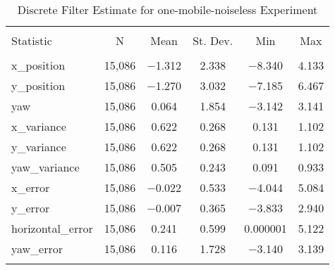 
\begin{table}[h] \centering 
  \caption{Discrete Filter Estimate for one-mobile-noiseless Experiment} 
  \label{tab:one_mobile_noiseless_discrete_summary} 
\begin{tabular}{@{\extracolsep{5pt}}lccccc} 
\\[-1.8ex]\hline 
\hline \\[-1.8ex] 
Statistic & \multicolumn{1}{c}{N} & \multicolumn{1}{c}{Mean} & \multicolumn{1}{c}{St. Dev.} & \multicolumn{1}{c}{Min} & \multicolumn{1}{c}{Max} \\ 
\hline \\[-1.8ex] 
x\_position & 15,086 & $-$1.312 & 2.338 & $-$8.340 & 4.133 \\ 
y\_position & 15,086 & $-$1.270 & 3.032 & $-$7.185 & 6.467 \\ 
yaw & 15,086 & 0.064 & 1.854 & $-$3.142 & 3.141 \\ 
x\_variance & 15,086 & 0.622 & 0.268 & 0.131 & 1.102 \\ 
y\_variance & 15,086 & 0.622 & 0.268 & 0.131 & 1.102 \\ 
yaw\_variance & 15,086 & 0.505 & 0.243 & 0.091 & 0.933 \\ 
x\_error & 15,086 & $-$0.022 & 0.533 & $-$4.044 & 5.084 \\ 
y\_error & 15,086 & $-$0.007 & 0.365 & $-$3.833 & 2.940 \\ 
horizontal\_error & 15,086 & 0.241 & 0.599 & 0.000001 & 5.122 \\ 
yaw\_error & 15,086 & 0.116 & 1.728 & $-$3.140 & 3.139 \\ 
\hline \\[-1.8ex] 
\end{tabular} 
\end{table} 
